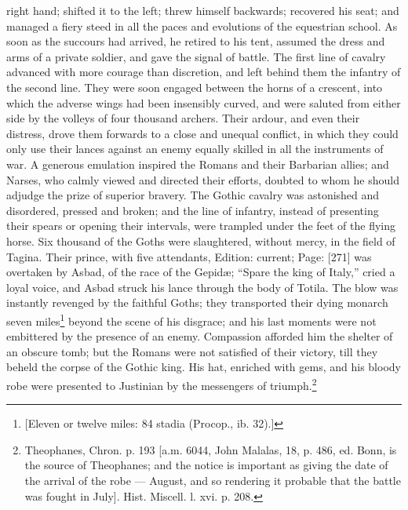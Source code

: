 right hand; shifted it to the left; threw himself backwards; recovered his seat; and managed a fiery steed in all the paces and evolutions of the equestrian school. As soon as the succours had arrived, he retired to his tent, assumed the dress and arms of a private soldier, and gave the signal of battle. The first line of cavalry advanced with more courage than discretion, and left behind them the infantry of the second line. They were soon engaged between the horns of a crescent, into which the adverse wings had been insensibly curved, and were saluted from either side by the volleys of four thousand archers. Their ardour, and even their distress, drove them forwards to a close and unequal conflict, in which they could only use their lances against an enemy equally skilled in all the instruments of war. A generous emulation inspired the Romans and their Barbarian allies; and Narses, who calmly viewed and directed their efforts, doubted to whom he should adjudge the prize of superior bravery. The Gothic cavalry was astonished and disordered, pressed and broken; and the line of infantry, instead of presenting their spears or opening their intervals, were trampled under the feet of the flying horse. Six thousand of the Goths were slaughtered, without mercy, in the field of Tagina. Their prince, with five attendants, Edition: current; Page: [271] was overtaken by Asbad, of the race of the Gepidæ; \texthebrew{“}Spare the king of Italy,\texthebrew{}” cried a loyal voice, and Asbad struck his lance through the body of Totila. The blow was instantly revenged by the faithful Goths; they transported their dying monarch seven miles\footnote{[Eleven or twelve miles: 84 stadia (Procop., ib. 32).]} beyond the scene of his disgrace; and his last moments were not embittered by the presence of an enemy. Compassion afforded him the shelter of an obscure tomb; but the Romans were not satisfied of their victory, till they beheld the corpse of the Gothic king. His hat, enriched with gems, and his bloody robe were presented to Justinian by the messengers of triumph.\footnote{Theophanes, Chron. p. 193 [a.m. 6044, John Malalas, 18, p. 486, ed. Bonn, is the source of Theophanes; and the notice is important as giving the date of the arrival of the robe \texthebrew{—} August, and so rendering it probable that the battle was fought in July]. Hist. Miscell. l. xvi. p. 208.}

